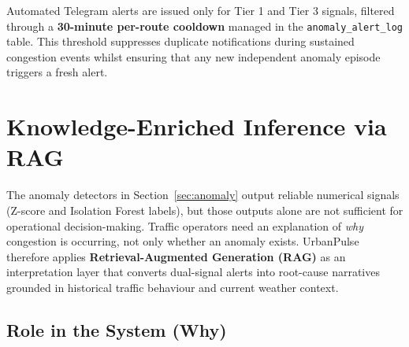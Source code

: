   Automated Telegram alerts are issued only for Tier 1 and Tier 3                                                                                         
  signals, filtered through a \textbf{30-minute per-route cooldown}
  managed in the \texttt{anomaly\_alert\_log} table. This threshold                                                                                       
  suppresses duplicate notifications during sustained congestion                                                                                          
  events whilst ensuring that any new independent anomaly episode                                                                                         
  triggers a fresh alert.                                                                                                                                 
                                                                                                                                                          
  \section{Knowledge-Enriched Inference via RAG}
  \label{sec:rag}                                                                                                                                         
                                                                                                                                                          
    The anomaly detectors in Section~\ref{sec:anomaly} output reliable
    numerical signals (Z-score and Isolation Forest labels), but those
    outputs alone are not sufficient for operational decision-making.
    Traffic operators need an explanation of \textit{why} congestion is
    occurring, not only whether an anomaly exists. UrbanPulse therefore
    applies \textbf{Retrieval-Augmented Generation (RAG)} \cite{lewis2020rag}
    as an interpretation layer that converts dual-signal alerts into
    root-cause narratives grounded in historical traffic behaviour and
    current weather context.

    \subsection{Role in the System (Why)}
    \label{subsec:vector_store}

